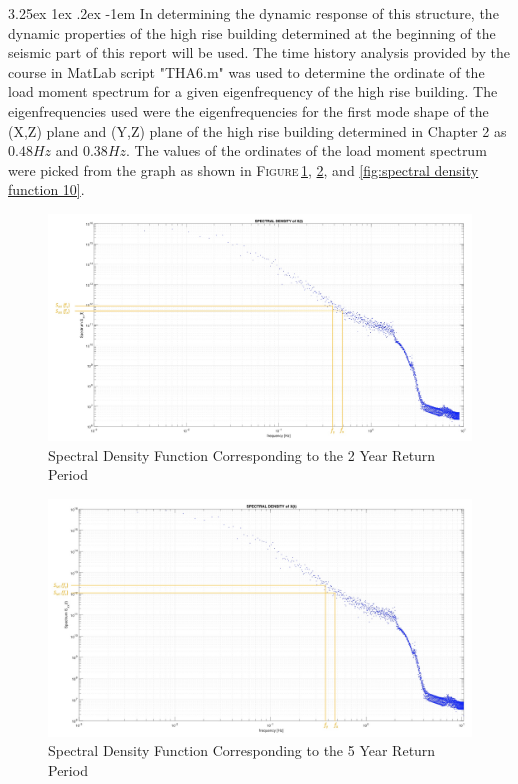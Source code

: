 \documentclass[11pt,a4paper,titlepage]{report}
\makeatletter
\renewcommand\paragraph{\@startsection{paragraph}{5}{\z@}%
  {3.25ex \@plus1ex \@minus.2ex}%
  {-1em}%
  {\normalfont\normalsize\bfseries}}
\makeatother
\begin{document}
\paragraph{}In determining the dynamic response of this structure, the dynamic properties of the high rise building determined at the beginning of the seismic part of this report will be used. The time history analysis provided by the course in MatLab script "THA6.m" was used to determine the ordinate of the load moment spectrum for a given eigenfrequency of the high rise building. The eigenfrequencies used were the eigenfrequencies for the first mode shape of the (X,Z) plane and (Y,Z) plane of the high rise building determined in Chapter 2 as $0.48Hz$ and $0.38Hz$. The values of the ordinates of the load moment spectrum were picked from the graph as shown in \textsc{Figure}\,\ref{fig:spectral density function 2}, \ref{fig:spectral density function 5}, and \ref{fig:spectral density function 10}.
\begin{figure} [h]
    \centering
    \includegraphics[width=16cm]{Spectral_Density_2YRP.jpeg}
    \caption{Spectral Density Function Corresponding to the 2 Year Return Period}
    \label{fig:spectral density function 2}
\end{figure}
\begin{figure} [h]
    \centering
    \includegraphics[width=16cm]{Spectral_Density_5YRP.jpeg}
    \caption{Spectral Density Function Corresponding to the 5 Year Return Period}
    \label{fig:spectral density function 5}
\end{figure}
\end{document}
